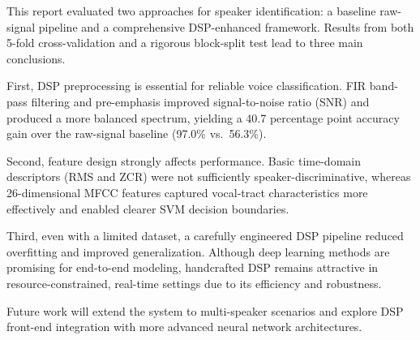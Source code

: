 This report evaluated two approaches for speaker identification: a baseline raw-signal pipeline and a comprehensive DSP-enhanced framework. Results from both 5-fold cross-validation and a rigorous block-split test lead to three main conclusions.

First, DSP preprocessing is essential for reliable voice classification. FIR band-pass filtering and pre-emphasis improved signal-to-noise ratio (SNR) and produced a more balanced spectrum, yielding a 40.7 percentage point accuracy gain over the raw-signal baseline (97.0\% vs.\ 56.3\%).

Second, feature design strongly affects performance. Basic time-domain descriptors (RMS and ZCR) were not sufficiently speaker-discriminative, whereas 26-dimensional MFCC features captured vocal-tract characteristics more effectively and enabled clearer SVM decision boundaries.

Third, even with a limited dataset, a carefully engineered DSP pipeline reduced overfitting and improved generalization. Although deep learning methods are promising for end-to-end modeling, handcrafted DSP remains attractive in resource-constrained, real-time settings due to its efficiency and robustness.

Future work will extend the system to multi-speaker scenarios and explore DSP front-end integration with more advanced neural network architectures.
